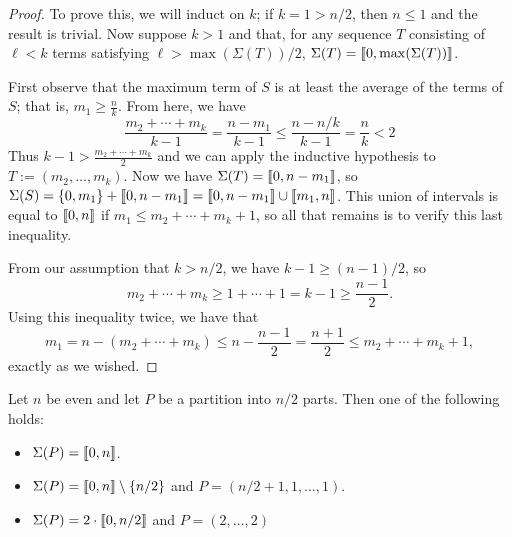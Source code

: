 \begin{proof}
	To prove this, we will induct on $k$; if $k=1 > n/2$, then $n \le 1$ and the result is trivial.
	Now suppose $k > 1$ and that, for any sequence $T$ consisting of $\ell < k$ terms satisfying $\ell > \max(\Sigma(T))/2$, $\Sigma(T) = \llbracket 0, \max(\Sigma(T)) \rrbracket$.
	
	First observe that the maximum term of $S$ is at least the average of the terms of $S$; that is, $m_1 \ge \frac{n}{k}$.
	From here, we have
	\[ \frac{m_2+\cdots + m_k}{k-1} = \frac{n-m_1}{k-1} \le \frac{n-n/k}{k-1} = \frac{n}{k} < 2 \]
	Thus $k - 1 > \frac{m_2+\cdots+m_k}{2}$ and we can apply the inductive hypothesis to $T := (m_2,\dots, m_k)$.
	Now we have $\Sigma(T) = \llbracket 0, n-m_1 \rrbracket$, so $\Sigma(S) = \{0,m_1\} + \llbracket 0,n-m_1 \rrbracket = \llbracket 0,n-m_1 \rrbracket \cup \llbracket m_1,n \rrbracket$.
	This union of intervals is equal to $\llbracket 0,n \rrbracket$ if $m_1 \le m_2 + \cdots + m_k +1$, so all that remains is to verify this last inequality.
	
	From our assumption that $k > n/2$, we have $k-1 \ge (n-1)/2$, so 
	\[m_2 + \cdots + m_k \ge 1 +\cdots + 1 = k-1 \ge \frac{n-1}{2}.\]
	Using this inequality twice, we have that
	\[m_1 = n - (m_2 + \cdots + m_k) \le n - \frac{n-1}{2} = \frac{n+1}{2} \le m_2 + \cdots + m_k + 1,\]
	exactly as we wished.
\end{proof}

\begin{lemma} \label{lem:n/2-partitions}
	Let $n$ be even and let $P$ be a partition into $n/2$ parts.
	Then one of the following holds:
	\begin{itemize}
		\item $\Sigma(P) = \llbracket 0, n \rrbracket$.
		\item $\Sigma(P) = \llbracket 0,n \rrbracket\setminus\{n/2\}$ and $P = (n/2+1,1,\dots,1)$.
		\item $\Sigma(P) = 2\cdot \llbracket 0, n/2 \rrbracket$ and $P = (2,\dots, 2)$
	\end{itemize}
\end{lemma}

